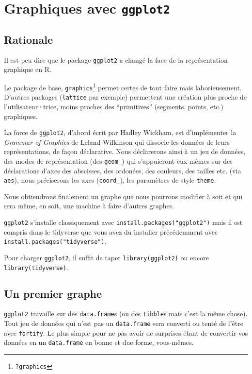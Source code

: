\documentclass[
  letterpaper,
  DIV=11,
  numbers=noendperiod]{scrreprt}
\begin{document}
\hypertarget{graphiques-avec-ggplot2}{%
\chapter{\texorpdfstring{Graphiques avec
\texttt{ggplot2}}{Graphiques avec ggplot2}}\label{graphiques-avec-ggplot2}}

\hypertarget{rationale}{%
\section{Rationale}\label{rationale}}

Il est peu dire que le package \texttt{ggplot2} a changé la face de la
représentation graphique en R.

Le package de base, \texttt{graphics}\footnote{\texttt{?graphics}}
permet certes de tout faire mais laborieusement. D'autres packages
(\texttt{lattice} par exemple) permettent une création plus proche de
l'utilisateur·trice, moins proches des ``primitives'' (segments, points,
etc.) graphiques.

La force de \texttt{ggplot2}, d'abord écrit par Hadley Wickham, est
d'implémenter la \emph{Grammar of Graphics} de Leland Wilkinson qui
dissocie les données de leurs représentations, de façon déclarative.
Nous déclarerons ainsi à un jeu de données, des modes de représentation
(des \texttt{geom\_}) qui s'appuieront eux-mêmes sur des déclarations
d'axes des abscisses, des ordonées, des couleurs, des tailles etc. (via
\texttt{aes}), nous préciserons les axes (\texttt{coord\_}), les
paramètres de style \texttt{theme}.

Nous obtiendrons finalement un graphe que nous pourrons modifier à soit
et qui sera même, en soit, une machine à faire d'autres graphes.

\texttt{ggplot2} s'installe classiquement avec
\texttt{install.packages("ggplot2")} mais il est compris dans le
tidyverse que vous avez du installer précédemment avec
\texttt{install.packages("tidyverse")}.

Pour charger \texttt{ggplot2}, il suffit de taper
\texttt{library(ggplot2)} ou encore \texttt{library(tidyverse)}.

\hypertarget{un-premier-graphe}{%
\section{Un premier graphe}\label{un-premier-graphe}}

\texttt{ggplot2} travaille sur des \texttt{data.frame}s (ou des
\texttt{tibble}s mais c'est la même chose). Tout jeu de données qui
n'est pas un \texttt{data.frame} sera converti ou tenté de l'être avec
\texttt{fortify}. Le plus simple pour ne pas avoir de surprises étant de
convertir vos données en un \texttt{data.frame} en bonne et due forme,
vous-mêmes.
\end{document}
